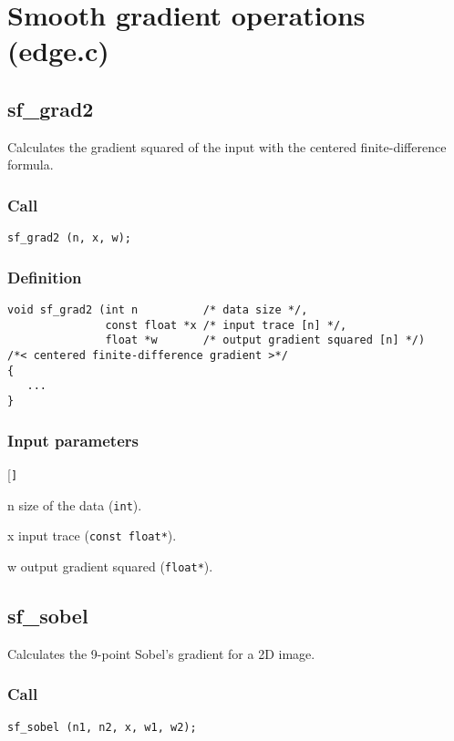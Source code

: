 \section{Smooth gradient operations (edge.c)}




\subsection{{sf\_grad2}}
Calculates the gradient squared of the input with the centered finite-difference formula.


\subsubsection*{Call}
\begin{verbatim}sf_grad2 (n, x, w);\end{verbatim}

\subsubsection*{Definition}
\begin{verbatim}
void sf_grad2 (int n          /* data size */, 
               const float *x /* input trace [n] */, 
               float *w       /* output gradient squared [n] */)
/*< centered finite-difference gradient >*/
{
   ...    
}
\end{verbatim}

\subsubsection*{Input parameters}
\begin{desclist}{\tt }{\quad}[\tt ]
   \setlength\itemsep{0pt}
   \item[n] size of the data (\texttt{int}). 
   \item[x] input trace (\texttt{const float*}).  
   \item[w] output gradient squared (\texttt{float*}).  
\end{desclist}




\subsection{{sf\_sobel}}\label{sec:sf_sobel}
Calculates the 9-point Sobel's gradient for a 2D image.

\subsubsection*{Call}
\begin{verbatim}sf_sobel (n1, n2, x, w1, w2);\end{verbatim}

